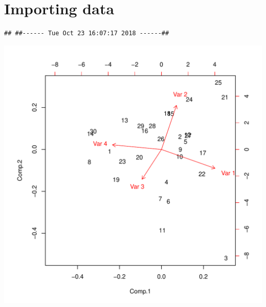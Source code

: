 \documentclass{article}
\begin{document}
\section{Importing data}
\begin{knitrout}
\color{fgcolor}\begin{kframe}
\begin{alltt}
\hlstd{()}
\end{alltt}
\begin{verbatim}
## ##------ Tue Oct 23 16:07:17 2018 ------##
\end{verbatim}
\begin{alltt}
\hlstd{(}\hlstd{(}\hlopt{::}\hlstd{(}\hlstd{,} \hlstd{(}\hlstd{,} \hlstd{)))))}
\end{alltt}
\end{kframe}
\includegraphics[width=\maxwidth]{figure/unnamed-chunk-6-1} 

\end{knitrout}
\end{document}
